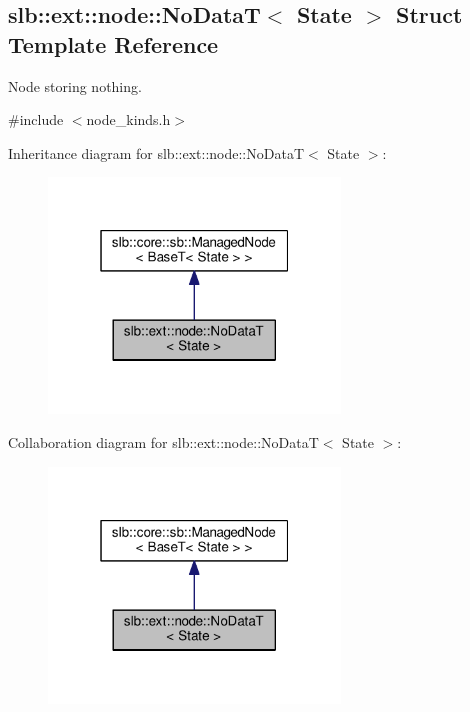 \hypertarget{structslb_1_1ext_1_1node_1_1NoDataT}{}\subsection{slb\+:\+:ext\+:\+:node\+:\+:No\+DataT$<$ State $>$ Struct Template Reference}
\label{structslb_1_1ext_1_1node_1_1NoDataT}


Node storing nothing.  




{\ttfamily \#include $<$node\+\_\+kinds.\+h$>$}



Inheritance diagram for slb\+:\+:ext\+:\+:node\+:\+:No\+DataT$<$ State $>$\+:\nopagebreak
\begin{figure}[H]
\begin{center}
\leavevmode
\includegraphics[width=220pt]{structslb_1_1ext_1_1node_1_1NoDataT__inherit__graph}
\end{center}
\end{figure}


Collaboration diagram for slb\+:\+:ext\+:\+:node\+:\+:No\+DataT$<$ State $>$\+:\nopagebreak
\begin{figure}[H]
\begin{center}
\leavevmode
\includegraphics[width=220pt]{structslb_1_1ext_1_1node_1_1NoDataT__coll__graph}
\end{center}
\end{figure}



